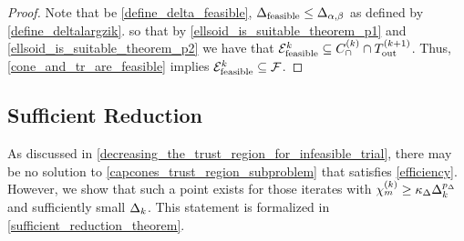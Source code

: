 \begin{proof}

Note that be \cref{define_delta_feasible}, ${\Delta_{\textrm{feasible}}} \le {\Delta_{\alpha,\beta}}$ as defined by \cref{define_deltalargzik}. so that
by \cref{ellsoid_is_suitable_theorem_p1} and \cref{ellsoid_is_suitable_theorem_p2} we have that 
${\mathcal E^k_{\textrm{feasible}}} \subseteq {C^{(k)}_{\cap}} \cap {T_{\text{out}}^{(k+1)}}$.
Thus, \cref{cone_and_tr_are_feasible} implies ${\mathcal E^k_{\textrm{feasible}}} \subseteq {\mathcal F}$.



\end{proof}







\subsection{Sufficient Reduction}
\label{sufficient_reduction_section}

As discussed in \cref{decreasing_the_trust_region_for_infeasible_trial}, there may be no solution to \cref{capcones_trust_region_subproblem} 
that satisfies \cref{efficiency}.
However, we show that such a point exists for those iterates with ${\chi_m^{(k)}} \ge \kappa_{\Delta}\Delta_k^{p_{\Delta}}$ and sufficiently small $\Delta_k$.
This statement is formalized in \cref{sufficient_reduction_theorem}.

% 
% 

